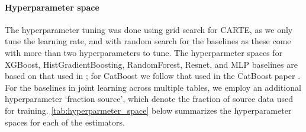 \documentclass{article}
\theoremstyle{plain}
\theoremstyle{definition}
\theoremstyle{remark}
\begin{document}
\paragraph{Hyperparameter space} The hyperparameter tuning was done using grid search for CARTE, as we only tune the learning rate, and with random search for the baselines as these come with more than two hyperparameters to tune. The hyperparmeter spaces for XGBoost, HistGradientBoosting, RandomForest, Resnet, and MLP baselines are based on that used in \citet{grinsztajnWhyTreebasedModels2022}; for CatBoost we follow that used in the CatBoost paper \citep{dorogushCatboost2018}. For the baselines in joint learning across multiple tables, we employ an additional hyperparameter `fraction source', which denote the fraction of source data used for training. \autoref{tab:hyperparmeter_space} below summarizes the hyperparameter spaces for each of the estimators.
\end{document}
